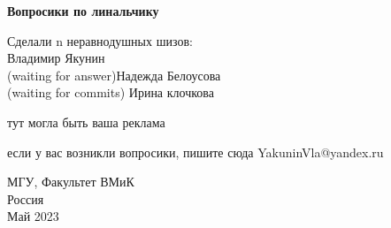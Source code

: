 \begin{titlepage}
    \begin{center}
  
       \vspace*{1cm}
        \huge
       \textbf{Вопросики по линальчику}
        \normalsize

  
            
       \vspace{1.5cm}

       \begin{flushright}
       Сделали n неравнодушных шизов:\\
       Владимир Якунин \\
       (waiting for answer)Надежда Белоусова\\
       (waiting for commits) Ирина клочкова\\
       \end{flushright}

       \vfill
            тут могла быть ваша реклама
       \vfill
     
        если у вас возникли вопросики, пишите сюда YakuninVla@yandex.ru
        
       МГУ, Факультет ВМиК\\
       Россия\\
       Май 2023
    \end{center}
\end{titlepage}